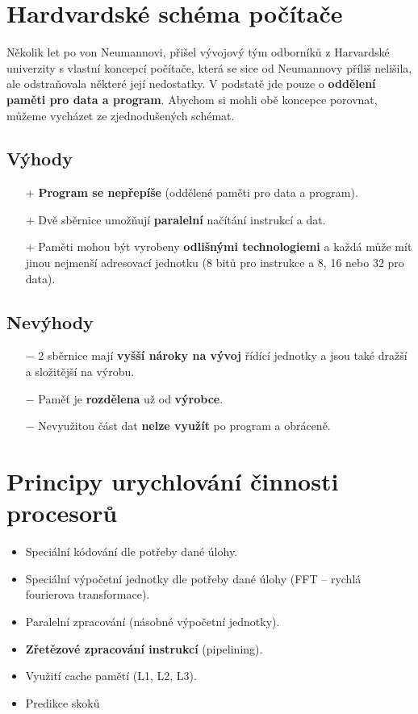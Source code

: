 \section{Hardvardské schéma počítače}
Několik let po von Neumannovi, přišel vývojový tým odborníků z Harvardské univerzity s vlastní koncepcí počítače, která se sice od Neumannovy příliš nelišila, ale odstraňovala některé její nedostatky. V podstatě jde pouze o \textbf{oddělení paměti pro data a program}. Abychom si mohli obě koncepce porovnat, můžeme vycházet ze zjednodušených schémat.
\newline

\noindent{}

\subsection*{Výhody}
\begin{itemize}
    \item[$+$]\textbf{Program se nepřepíše} (oddělené paměti pro data a program).
    \item[$+$]Dvě sběrnice umožňují \textbf{paralelní} načítání instrukcí a dat.
    \item[$+$]Paměti mohou být vyrobeny \textbf{odlišnými technologiemi }a každá může mít jinou nejmenší adresovací jednotku (8 bitů pro instrukce a 8, 16 nebo 32 pro data).
\end{itemize}


\subsection*{Nevýhody}
\begin{itemize}
    \item[$-$]2 sběrnice mají \textbf{vyšší nároky na vývoj} řídící jednotky a jsou také dražší a složitější na výrobu.
    \item[$-$]Paměť je \textbf{rozdělena} už od \textbf{výrobce}.
    \item[$-$]Nevyužitou část dat \textbf{nelze využít }po program a obráceně.
\end{itemize}

\pagebreak
\section{Principy urychlování činnosti procesorů}
\begin{itemize}
    \item{Speciální kódování dle potřeby dané úlohy}.
    \item{Speciální výpočetní jednotky dle potřeby dané úlohy (FFT -- rychlá fourierova transformace)}.
    \item{Paralelní zpracování (násobné výpočetní jednotky)}.
    \item{\textbf{Zřetězové zpracování instrukcí} (pipelining)}.
    \item{Využití cache pamětí (L1, L2, L3)}.
    \item{Predikce skoků}
\end{itemize}
